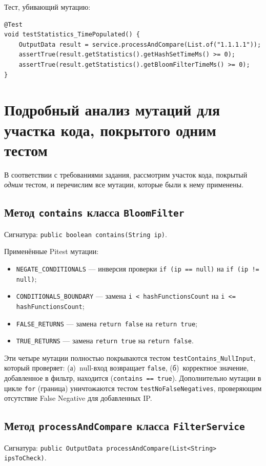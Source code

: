 Тест, убивающий мутацию:
\begin{verbatim}
@Test
void testStatistics_TimePopulated() {
    OutputData result = service.processAndCompare(List.of("1.1.1.1"));
    assertTrue(result.getStatistics().getHashSetTimeMs() >= 0);
    assertTrue(result.getStatistics().getBloomFilterTimeMs() >= 0);
}
\end{verbatim}

\section{Подробный анализ мутаций для участка кода, покрытого одним тестом} \label{ch4:sec2}

В соответствии с требованиями задания, рассмотрим участок кода, покрытый \emph{одним} тестом, и перечислим все мутации, которые были к нему применены.

\subsection{Метод \texttt{contains} класса \texttt{BloomFilter}}
Сигнатура: \texttt{public boolean contains(String ip)}.

Применённые Pitest мутации:
\begin{itemize}
    \item \texttt{NEGATE\_CONDITIONALS} --- инверсия проверки \texttt{if (ip == null)} на \texttt{if (ip != null)};
    \item \texttt{CONDITIONALS\_BOUNDARY} --- замена \texttt{i < hashFunctionsCount} на \texttt{i <= hashFunctionsCount};
    \item \texttt{FALSE\_RETURNS} --- замена \texttt{return false} на \texttt{return true};
    \item \texttt{TRUE\_RETURNS} --- замена \texttt{return true} на \texttt{return false}.
\end{itemize}

Эти четыре мутации полностью покрываются тестом \texttt{testContains\_NullInput}, который проверяет: (а)~null-вход возвращает \texttt{false}, (б)~корректное значение, добавленное в фильтр, находится (\texttt{contains == true}). Дополнительно мутации в цикле \texttt{for} (граница) уничтожаются тестом \texttt{testNoFalseNegatives}, проверяющим отсутствие False Negative для добавленных IP.

\subsection{Метод \texttt{processAndCompare} класса \texttt{FilterService}}
Сигнатура: \texttt{public OutputData processAndCompare(List<String> ipsToCheck)}.

